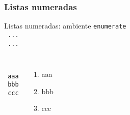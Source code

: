 \begin{frame}
  \frametitle{Listas numeradas}
    \begin{block}{Listas numeradas: ambiente \texttt{enumerate}}
    \texttt{\\
        \purple{\string\item}\ ...\\
        \purple{\string\item}\ ...\\
        }
  \end{block}

    \begin{exemplo}

    \begin{columns}[c]
      \column{4cm}
      \texttt{\\
          \purple{\string\item}\ aaa\\
          \purple{\string\item}\ bbb\\
          \purple{\string\item}\ ccc\\
          }
      \column{3cm}
      \begin{enumerate}
      \item aaa
      \item bbb
      \item ccc
      \end{enumerate}
    \end{columns}

  \end{exemplo}


\end{frame}



